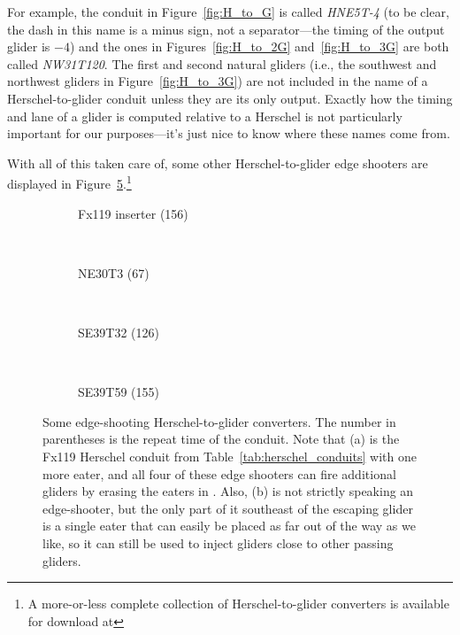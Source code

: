 For example, the conduit in Figure~\ref{fig:H_to_G} is called \emph{HNE5T-4} (to be clear, the dash in this name is a minus sign, not a separator---the timing of the output glider is $-4$) and the ones in Figures~\ref{fig:H_to_2G} and~\ref{fig:H_to_3G} are both called \emph{NW31T120}. The first and second natural gliders (i.e., the southwest and northwest gliders in Figure~\ref{fig:H_to_3G}) are not included in the name of a Herschel-to-glider conduit unless they are its only output. Exactly how the timing and lane of a glider is computed relative to a Herschel is not particularly important for our purposes---it's just nice to know where these names come from.

With all of this taken care of, some other Herschel-to-glider edge shooters are displayed in Figure~\ref{fig:herschel_to_glider_edge}.\footnote{A more-or-less complete collection of Herschel-to-glider converters is available for download at }

\begin{figure}[!htb]
	\centering
	\begin{subfigure}{.205\textwidth}
		\centering
		\caption{Fx119 inserter (156)}
		\label{fig:herschel_to_glider_edge_3}
	\end{subfigure} \ \ \ %
	\begin{subfigure}{.245\textwidth}
		\centering\vspace*{0.9cm}
		\caption{NE30T3 (67)}
		\label{fig:herschel_to_glider_edge_4}
	\end{subfigure} \ \ \ %
	\begin{subfigure}{.245\textwidth}
		\centering\vspace*{1.2cm}
		\caption{SE39T32 (126)}
		\label{fig:herschel_to_glider_edge_1}
	\end{subfigure} \ \ \ %
	\begin{subfigure}{.235\textwidth}
		\centering
		\caption{SE39T59 (155)}
		\label{fig:herschel_to_glider_edge_2}
	\end{subfigure}
	\caption{Some edge-shooting Herschel-to-glider converters. The number in parentheses is the repeat time of the conduit. Note that (a) is the Fx119 Herschel conduit from Table~\ref{tab:herschel_conduits} with one more eater, and all four of these edge shooters can fire additional gliders by erasing the eaters in . Also, (b) is not strictly speaking an edge-shooter, but the only part of it southeast of the escaping glider is a single eater that can easily be placed as far out of the way as we like, so it can still be used to inject gliders close to other passing gliders.}\label{fig:herschel_to_glider_edge}
\end{figure}


